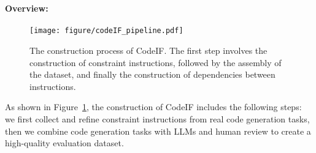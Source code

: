 \section{\bench{}}

\paragraph{Overview:}
\begin{figure}
    \centering
    \texttt{[image: figure/codeIF\_pipeline.pdf]}
    \caption{ The construction process of CodeIF. The first step involves the construction of constraint instructions, followed by the assembly of the dataset, and finally the construction of dependencies between instructions.}
    \label{fig:code_IF_all}
\end{figure}

 As shown in Figure~\ref{fig:code_IF_all}, the construction of CodeIF includes the following steps: we first collect and refine constraint instructions from real code generation tasks, then we combine code generation tasks with LLMs and human review to create a high-quality evaluation dataset.

 
